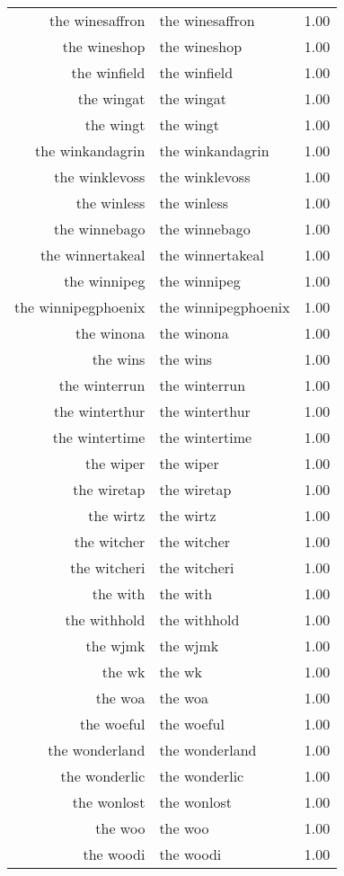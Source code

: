 \begin{table}[ht]
\begin{tabular}{rlr}
  the winesaffron & the winesaffron & 1.00 \\ 
  the wineshop & the wineshop & 1.00 \\ 
  the winfield & the winfield & 1.00 \\ 
  the wingat & the wingat & 1.00 \\ 
  the wingt & the wingt & 1.00 \\ 
  the winkandagrin & the winkandagrin & 1.00 \\ 
  the winklevoss & the winklevoss & 1.00 \\ 
  the winless & the winless & 1.00 \\ 
  the winnebago & the winnebago & 1.00 \\ 
  the winnertakeal & the winnertakeal & 1.00 \\ 
  the winnipeg & the winnipeg & 1.00 \\ 
  the winnipegphoenix & the winnipegphoenix & 1.00 \\ 
  the winona & the winona & 1.00 \\ 
  the wins & the wins & 1.00 \\ 
  the winterrun & the winterrun & 1.00 \\ 
  the winterthur & the winterthur & 1.00 \\ 
  the wintertime & the wintertime & 1.00 \\ 
  the wiper & the wiper & 1.00 \\ 
  the wiretap & the wiretap & 1.00 \\ 
  the wirtz & the wirtz & 1.00 \\ 
  the witcher & the witcher & 1.00 \\ 
  the witcheri & the witcheri & 1.00 \\ 
  the with & the with & 1.00 \\ 
  the withhold & the withhold & 1.00 \\ 
  the wjmk & the wjmk & 1.00 \\ 
  the wk & the wk & 1.00 \\ 
  the woa & the woa & 1.00 \\ 
  the woeful & the woeful & 1.00 \\ 
  the wonderland & the wonderland & 1.00 \\ 
  the wonderlic & the wonderlic & 1.00 \\ 
  the wonlost & the wonlost & 1.00 \\ 
  the woo & the woo & 1.00 \\ 
  the woodi & the woodi & 1.00 \\ 

\end{tabular}
\end{table}
